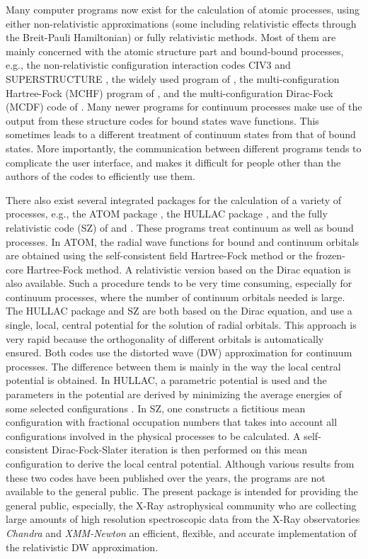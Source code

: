 \documentclass{elsart}
\begin{document}
Many computer programs now exist for the calculation of atomic processes,
using either non-relativistic approximations (some including relativistic
effects through the Breit-Pauli Hamiltonian) or fully relativistic
methods. Most of them are mainly concerned with the atomic structure part and
bound-bound processes, e.g., the non-relativistic configuration interaction
codes CIV3 \citep{hibbert75} and SUPERSTRUCTURE \citep{eissner74}, the widely
used program of \citet{cowan81}, the multi-configuration Hartree-Fock (MCHF)
program of \citet{fischer00}, and the multi-configuration Dirac-Fock (MCDF)
code of \citet{grant80}. Many newer programs for continuum processes make use
of the output from these structure codes for bound states wave functions. This
sometimes leads to 
a different treatment of continuum states from that of bound states. More
importantly, the communication between different programs tends to complicate
the user interface, and makes it difficult for people other than the authors
of the codes to efficiently use them. 

There also exist several integrated
packages for the calculation of a variety of processes, e.g., the ATOM package
\citep{amusia97}, the HULLAC package \citep{barshalom01}, and the fully
relativistic code (SZ) of \citet{sampson89} and \citet{zhang89}. These
programs treat continuum as well as bound processes. In 
ATOM, the radial wave functions for bound and continuum orbitals are obtained
using the self-consistent field Hartree-Fock method or the frozen-core
Hartree-Fock method. A relativistic version based on the Dirac equation is
also available. Such a procedure tends to be very time consuming, especially
for continuum processes, where the number of continuum orbitals needed is
large. The HULLAC package and SZ are both based on the Dirac equation, and use
a single, local, central potential for the solution of radial orbitals. This
approach is very rapid because the orthogonality of 
different orbitals is automatically ensured. Both codes use the distorted wave
(DW) approximation for continuum processes. The difference between them is
mainly in the way the local central potential is obtained. In HULLAC, 
a parametric potential is used and the parameters in the potential are derived
by minimizing the average energies of some selected configurations
\citep{klapisch77}. In SZ, one 
constructs a fictitious mean configuration with fractional occupation numbers
that takes into account all configurations involved in the physical processes
to be calculated. A self-consistent Dirac-Fock-Slater iteration is then
performed on this mean configuration to derive the local central potential. 
Although various results from these two codes have been published over the
years, the programs are not available to the general public. The present
package is intended for providing the general public, especially, the X-Ray
astrophysical community who are collecting large amounts of high resolution
spectroscopic data from the X-Ray observatories \textit{Chandra} and
\textit{XMM-Newton} an efficient, flexible, and accurate implementation of
the relativistic DW approximation.  
\end{document}
